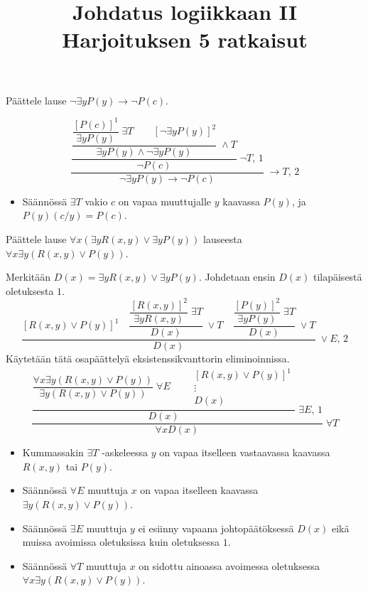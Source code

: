 \documentclass[11pt,a4paper]{amsart}
\title{Johdatus logiikkaan II\\Harjoituksen 5 ratkaisut}
\author{}
\date{}
\begin{document}
\raggedbottom


\begin{exercise}
  Päättele lause \(\neg\exists yP(y) \to \neg P(c)\).
\end{exercise}

\begin{solution}
  \[
    \dfrac{
      \dfrac{
        \dfrac{
          \dfrac{[P(c)]^1}{\exists yP(y)}\;\exists T
          \qquad [\neg\exists yP(y)]^2
        }{\exists yP(y)\land\neg\exists yP(y)}\;\land T
      }{\neg P(c)}\;\neg T,\,1
    }{\neg\exists yP(y)\to\neg P(c)}\;\to T,\,2
  \]
  \begin{itemize}
    \item Säännössä \(\exists T\) vakio \(c\) on vapaa muuttujalle \(y\)
      kaavassa \(P(y)\), ja \(P(y)(c/y)=P(c)\).\qedhere
  \end{itemize}
\end{solution}

\begin{exercise}
  Päättele lause \(\forall x(\exists yR(x,y) \lor \exists yP(y))\)
  lauseesta \(\forall x\exists y(R(x,y) \lor P(y))\).
\end{exercise}

\begin{solution}
  Merkitään \(D(x)=\exists yR(x,y)\lor\exists yP(y)\).
  Johdetaan ensin \(D(x)\) tilapäisestä oletuksesta \(1\).
  \[
    \dfrac{
      [R(x,y)\lor P(y)]^1
      \quad
      \dfrac{\dfrac{[R(x,y)]^2}{\exists yR(x,y)}\;\exists T}
      {D(x)}\;\lor T
      \quad
      \dfrac{\dfrac{[P(y)]^2}{\exists yP(y)}\;\exists T}
      {D(x)}\;\lor T
    }{D(x)}\;\lor E,\,2
  \]
  Käytetään tätä osapäättelyä eksistenssikvanttorin eliminoinnissa.
  \[
    \dfrac{
      \dfrac{
        \dfrac{\forall x\exists y(R(x,y)\lor P(y))}
        {\exists y(R(x,y)\lor P(y))}\;\forall E
        \qquad
        \begin{gathered}
          [R(x,y)\lor P(y)]^1 \\
          \vdots \\
          D(x)
        \end{gathered}
      }{D(x)}\;\exists E,\,1
    }{\forall xD(x)}\;\forall T
  \]
  \begin{itemize}
    \item Kummassakin \(\exists T\) -askeleessa \(y\) on vapaa itselleen
      vastaavassa kaavassa \(R(x,y)\) tai \(P(y)\).
    \item Säännössä \(\forall E\) muuttuja \(x\) on vapaa itselleen
      kaavassa \(\exists y(R(x,y)\lor P(y))\).
    \item Säännössä \(\exists E\) muuttuja \(y\) ei esiinny vapaana
      johtopäätöksessä \(D(x)\) eikä muissa avoimissa oletuksissa kuin
      oletuksessa \(1\).
    \item Säännössä \(\forall T\) muuttuja \(x\) on sidottu ainoassa
      avoimessa oletuksessa \(\forall x\exists y(R(x,y)\lor P(y))\).\qedhere
  \end{itemize}
\end{solution}
\end{document}
